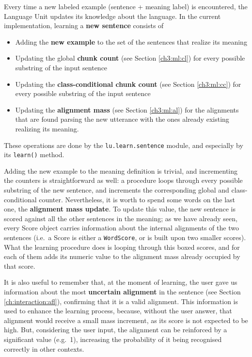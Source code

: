 Every time a new labeled example (sentence + meaning label) is encountered, the Language Unit updates its knowledge about the language. In the current implementation, learning a \textbf{new sentence} consists of
\begin{itemize}
	\item Adding the \textbf{new example} to the set of the sentences that realize its meaning
	\item Updating the global \textbf{chunk count} (see Section \ref{ch3:ml:cl}) for every possible substring of the input sentence
	\item Updating the \textbf{class-conditional chunk count} (see Section \ref{ch3:ml:cc}) for every possible substring of the input sentence
	\item Updating the \textbf{alignment mass} (see Section \ref{ch3:ml:al}) for the alignments that are found parsing the new utterance with the ones already existing realizing its meaning.
\end{itemize}
These operations are done by the \texttt{lu.learn.sentence} module, and especially by its \texttt{learn()} method.

Adding the new example to the meaning definition is trivial, and incrementing the counters is straightforward as well: a procedure loops through every possible substring of the new sentence, and increments the corresponding global and class-conditional counter. Nevertheless, it is worth to spend some words on the last one, the \textbf{alignment mass update}. To update this value, the new sentence is scored against all the other sentences in the meaning; as we have already seen, every Score object carries information about the internal alignments of the two sentences (i.e.\ a Score is either a \texttt{WordScore}, or is built upon two smaller scores). What the learning procedure does is looping through this boxed scores, and for each of them adds its numeric value to the alignment mass already occupied by that score.

It is also useful to remember that, at the moment of learning, the user gave us information about the most \textbf{uncertain alignment} in the sentence (see Section \ref{ch:interaction:afl}), confirming that it is a valid alignment. This information is used to enhance the learning process, because, without the user answer, that alignment would receive a small mass increment, as its score is not expected to be high. But, considering the user input, the alignment can be reinforced by a significant value (e.g.\ 1), increasing the probability of it being recognised correctly in other contexts.

